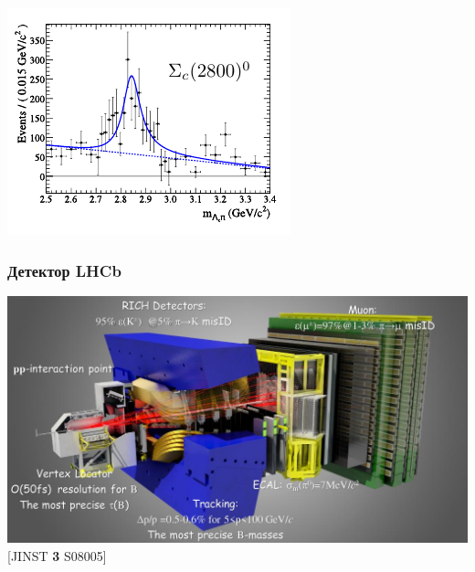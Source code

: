 \documentclass[10pt]{beamer}
\begin{document}
\begin{frame}[label=measurements-overview]
{    
  }
  \parbox{.45\linewidth}{ \centering
    \includegraphics[width=.8\linewidth]{figures/sc2800-babar-mod}
  }
\end{frame}%

\begin{frame}[label=lhcb]%
  \frametitle{Детектор LHCb}
  \centering
  \includegraphics[height=.7\textheight]{figures/lhcb-detector-captions}
  \vfill [JINST \textbf{3} S08005]
\end{frame}%
\end{document}
